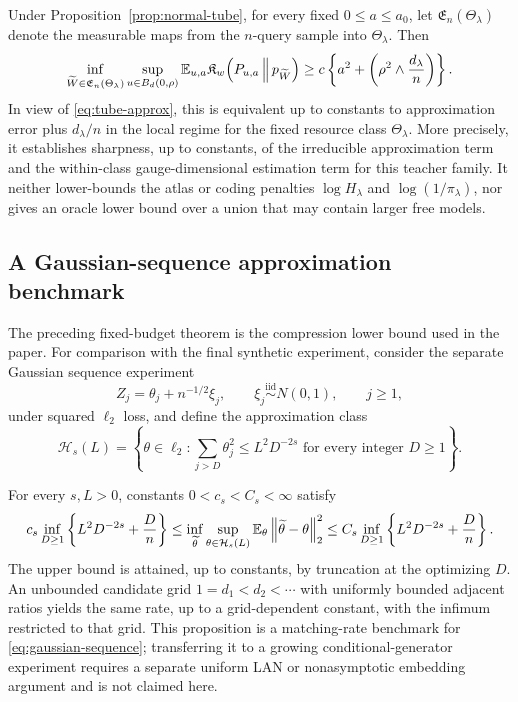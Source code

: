 \begin{theorem}
\label{thm:tube-lower}
Under Proposition~\ref{prop:normal-tube}, for every fixed
\(0\le a\le a_0\), let \(\mathfrak E_n(\Theta_\lambda)\) denote the measurable
maps from the \(n\)-query sample into \(\Theta_\lambda\). Then
\begin{equation}
\inf_{\widetilde W\in\mathfrak E_n(\Theta_\lambda)}
\sup_{u\in B_d(0,\rho)}
\mathbb E_{u,a}\mathfrak K_w\!\left(P_{u,a}\,\middle\|\,p_{\widetilde W}\right)
\ge c\left\{a^2+
\left(\rho^2\wedge\frac{d_\lambda}{n}\right)\right\}.
\label{eq:tube-lower-result}
\end{equation}
In view of \cref{eq:tube-approx}, this is equivalent up to constants to
approximation error plus \(d_\lambda/n\) in the local regime for the fixed
resource class \(\Theta_\lambda\). More precisely, it establishes sharpness,
up to constants, of the irreducible approximation term and the within-class
gauge-dimensional estimation term for this teacher family. It neither
lower-bounds the atlas or coding penalties \(\log H_\lambda\) and
\(\log(1/\pi_\lambda)\), nor gives an oracle lower bound over a union that may
contain larger free models.
\end{theorem}

\subsection{A Gaussian-sequence approximation benchmark}

The preceding fixed-budget theorem is the compression lower bound used in the
paper.  For comparison with the final synthetic experiment, consider the
separate Gaussian sequence experiment
\begin{equation}
 Z_j=\theta_j+n^{-1/2}\xi_j,\qquad
 \xi_j\stackrel{\mathrm{iid}}\sim N(0,1),\qquad j\ge1,
 \label{eq:gaussian-sequence}
\end{equation}
under squared \(\ell_2\) loss, and define the approximation class
\[
 \mathcal H_s(L)=\left\{\theta\in\ell_2:
 \sum_{j>D}\theta_j^2\le L^2D^{-2s}
 \text{ for every integer }D\ge1\right\}.
\]

\begin{proposition}
\label{cor:scale}
For every \(s,L>0\), constants \(0<c_s<C_s<\infty\) satisfy
\[
 c_s\inf_{D\ge1}\left\{L^2D^{-2s}+\frac Dn\right\}
 \le
 \inf_{\widetilde\theta}\sup_{\theta\in\mathcal H_s(L)}
 \mathbb E_\theta\left\lVert \widetilde\theta-\theta\right\rVert_2^2
 \le
 C_s\inf_{D\ge1}\left\{L^2D^{-2s}+\frac Dn\right\}.
\]
The upper bound is attained, up to constants, by truncation at the optimizing
\(D\).  An unbounded candidate grid \(1=d_1<d_2<\cdots\) with uniformly
bounded adjacent ratios yields the same rate, up to a grid-dependent constant,
with the infimum restricted to that grid. This proposition is a
matching-rate benchmark for \cref{eq:gaussian-sequence}; transferring it to a growing
conditional-generator experiment requires a separate uniform LAN or
nonasymptotic embedding argument and is not claimed here.
\end{proposition}

